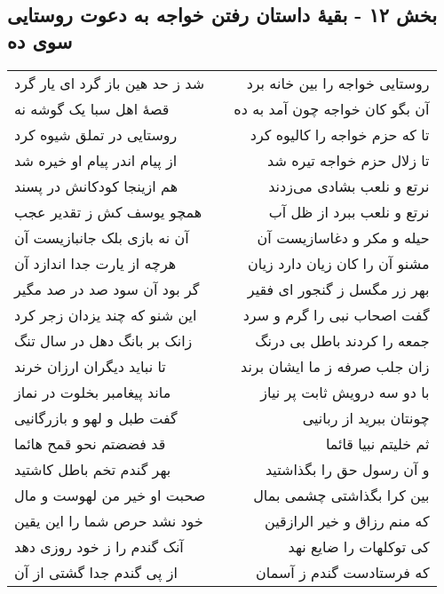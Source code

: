 \begin{center}
\section*{بخش ۱۲ - بقیهٔ داستان رفتن خواجه به دعوت روستایی سوی ده}
\label{sec:sh012}
\begin{longtable}{l p{0.5cm} r}
شد ز حد هین باز گرد ای یار گرد
&&
روستایی خواجه را بین خانه برد
\\
قصهٔ اهل سبا یک گوشه نه
&&
آن بگو کان خواجه چون آمد به ده
\\
روستایی در تملق شیوه کرد
&&
تا که حزم خواجه را کالیوه کرد
\\
از پیام اندر پیام او خیره شد
&&
تا زلال حزم خواجه تیره شد
\\
هم ازینجا کودکانش در پسند
&&
نرتع و نلعب بشادی می‌زدند
\\
همچو یوسف کش ز تقدیر عجب
&&
نرتع و نلعب ببرد از ظل آب
\\
آن نه بازی بلک جانبازیست آن
&&
حیله و مکر و دغاسازیست آن
\\
هرچه از یارت جدا اندازد آن
&&
مشنو آن را کان زیان دارد زیان
\\
گر بود آن سود صد در صد مگیر
&&
بهر زر مگسل ز گنجور ای فقیر
\\
این شنو که چند یزدان زجر کرد
&&
گفت اصحاب نبی را گرم و سرد
\\
زانک بر بانگ دهل در سال تنگ
&&
جمعه را کردند باطل بی درنگ
\\
تا نباید دیگران ارزان خرند
&&
زان جلب صرفه ز ما ایشان برند
\\
ماند پیغامبر بخلوت در نماز
&&
با دو سه درویش ثابت پر نیاز
\\
گفت طبل و لهو و بازرگانیی
&&
چونتان ببرید از ربانیی
\\
قد فضضتم نحو قمح هائما
&&
ثم خلیتم نبیا قائما
\\
بهر گندم تخم باطل کاشتید
&&
و آن رسول حق را بگذاشتید
\\
صحبت او خیر من لهوست و مال
&&
بین کرا بگذاشتی چشمی بمال
\\
خود نشد حرص شما را این یقین
&&
که منم رزاق و خیر الرازقین
\\
آنک گندم را ز خود روزی دهد
&&
کی توکلهات را ضایع نهد
\\
از پی گندم جدا گشتی از آن
&&
که فرستادست گندم ز آسمان
\\
\end{longtable}
\end{center}
